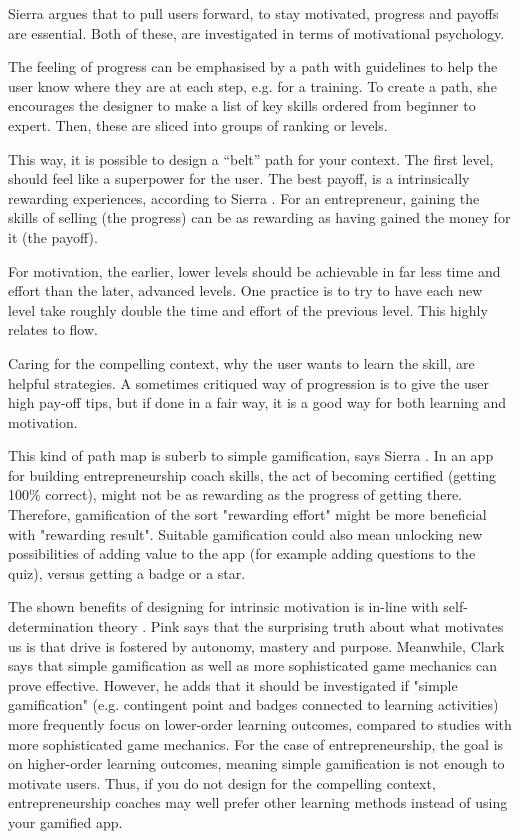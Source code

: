 Sierra argues that to pull users forward, to stay motivated, progress and payoffs are essential. Both of these, are investigated in terms of motivational psychology.

The feeling of progress can be emphasised by a path with guidelines to help the user know where they are at each step, e.g. for a training. To create a path, she encourages the designer to make a list of key skills ordered from beginner to expert. Then, these are sliced into groups of ranking or levels.

This way, it is possible to design a “belt” path for your context. The first level, should feel like a superpower for the user. The best payoff, is a intrinsically rewarding experiences, according to Sierra \citep{sierra}. For an entrepreneur, gaining the skills of selling (the progress) can be as rewarding as having gained the money for it (the payoff).

For motivation, the earlier, lower levels should be achievable in far less time and effort than the later, advanced levels. One practice is to try to have each new level take roughly double the time and effort of the previous level. This highly relates to flow.

Caring for the compelling context, why the user wants to learn the skill, are helpful strategies. A sometimes critiqued way of progression is to give the user high pay-off tips, but if done in a fair way, it is a good way for both learning and motivation.

This kind of path map is suberb to simple gamification, says Sierra \citep{sierra}. In an app for building entrepreneurship coach skills, the act of becoming certified (getting 100\% correct), might not be as rewarding as the progress of getting there. Therefore, gamification of the sort "rewarding effort" might be more beneficial with "rewarding result". Suitable gamification could also mean unlocking new possibilities of adding value to the app (for example adding questions to the quiz), versus getting a badge or a star.

The shown benefits of designing for intrinsic motivation is in-line with self-determination theory \citep{deci} \citep{ryan}.  Pink \citep{pink} says that the surprising truth about what motivates us is that drive is fostered by autonomy, mastery and purpose. Meanwhile, Clark \citep{gates} says that simple gamification as well as more sophisticated game mechanics can prove effective. However, he adds that it should be investigated if "simple gamification" (e.g. contingent point and badges connected to learning activities) more frequently focus on lower-order learning outcomes, compared to studies with more sophisticated game mechanics. For the case of entrepreneurship, the goal is on higher-order learning outcomes, meaning simple gamification is not enough to motivate users. Thus, if you do not design for the compelling context, entrepreneurship coaches may well prefer other learning methods instead of using your gamified app.
